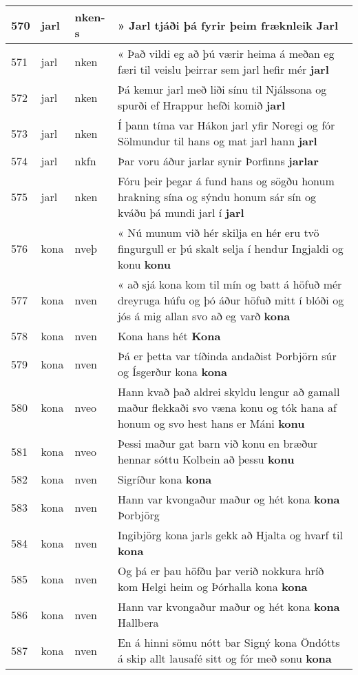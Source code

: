 \documentclass{article}
\begin{document}
\begin{longtable}{p{1cm}|p{1cm}|p{1cm}|p{13cm}}
\hline
570&jarl&nken-s&» Jarl tjáði þá fyrir þeim fræknleik \textbf{Jarl} \\
\hline
571&jarl&nken&« Það vildi eg að þú værir heima á meðan eg færi til veislu þeirrar sem jarl hefir mér \textbf{jarl} \\
\hline
572&jarl&nken&Þá kemur jarl með liði sínu til Njálssona og spurði ef Hrappur hefði komið \textbf{jarl} \\
\hline
573&jarl&nken&Í þann tíma var Hákon jarl yfir Noregi og fór Sölmundur til hans og mat jarl hann \textbf{jarl} \\
\hline
574&jarl&nkfn&Þar voru áður jarlar synir Þorfinns \textbf{jarlar} \\
\hline
575&jarl&nken&Fóru þeir þegar á fund hans og sögðu honum hrakning sína og sýndu honum sár sín og kváðu þá mundi jarl í \textbf{jarl} \\
\hline
576&kona&nveþ&« Nú munum við hér skilja en hér eru tvö fingurgull er þú skalt selja í hendur Ingjaldi og konu \textbf{konu} \\
\hline
577&kona&nven&« að sjá kona kom til mín og batt á höfuð mér dreyruga húfu og þó áður höfuð mitt í blóði og jós á mig allan svo að eg varð \textbf{kona} \\
\hline
578&kona&nven&Kona hans hét \textbf{Kona} \\
\hline
579&kona&nven&Þá er þetta var tíðinda andaðist Þorbjörn súr og Ísgerður kona \textbf{kona} \\
\hline
580&kona&nveo&Hann kvað það aldrei skyldu lengur að gamall maður flekkaði svo væna konu og tók hana af honum og svo hest hans er Máni \textbf{konu} \\
\hline
581&kona&nveo&Þessi maður gat barn við konu en bræður hennar sóttu Kolbein að þessu \textbf{konu} \\
\hline
582&kona&nven&Sigríður kona \textbf{kona} \\
\hline
583&kona&nven&Hann var kvongaður maður og hét kona \textbf{kona} Þorbjörg\\
\hline
584&kona&nven&Ingibjörg kona jarls gekk að Hjalta og hvarf til \textbf{kona} \\
\hline
585&kona&nven&Og þá er þau höfðu þar verið nokkura hríð kom Helgi heim og Þórhalla kona \textbf{kona} \\
\hline
586&kona&nven&Hann var kvongaður maður og hét kona \textbf{kona} Hallbera\\
\hline
587&kona&nven&En á hinni sömu nótt bar Signý kona Öndótts á skip allt lausafé sitt og fór með sonu \textbf{kona} \\

\end{longtable}
\end{document}
